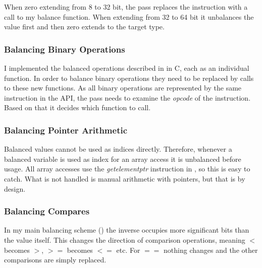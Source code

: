 When zero extending from 8 to 32 bit, the pass replaces the instruction with a call to my balance function.
When extending from 32 to 64 bit it unbalances the value first and then zero extends to the target type.

\subsubsection{Balancing Binary Operations}
I implemented the balanced operations described in  in C, each as an individual function.
In order to balance binary operations they need to be replaced by calls to these new functions.
As all binary operations are represented by the same instruction in the \llvm{} API, the pass needs to examine the \emph{opcode} of the instruction.
Based on that it decides which function to call.

\subsubsection{Balancing Pointer Arithmetic}
Balanced values cannot be used as indices directly.
Therefore, whenever a balanced variable is used as index for an array access it is unbalanced before usage.
All array accesses use the \emph{getelementptr} instruction in \ir{}, so this is easy to catch.
What is not handled is manual arithmetic with pointers, but that is by design.

\subsubsection{Balancing Compares}
In my main balancing scheme () the inverse occupies more significant bits than the value itself.
This changes the direction of comparison operations, meaning $<$ becomes $>$, $>=$ becomes $<=$ etc.
For $==$ nothing changes and the other comparisons are simply replaced.
